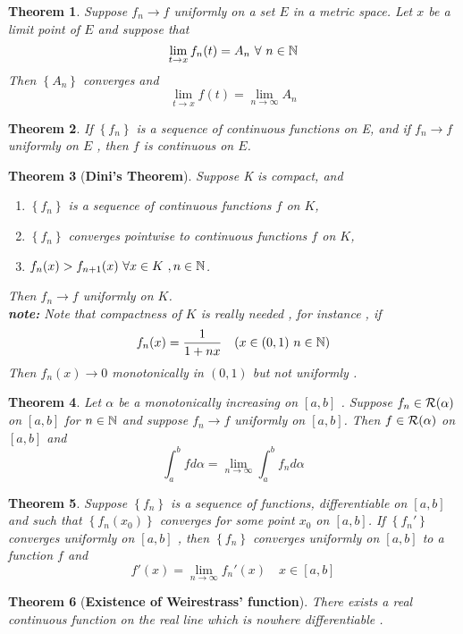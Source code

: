 \documentclass{article}
\newcommand{\set}[1]{\left\{#1\right\}}
\newtheorem{theorem}{Theorem}[section]
\begin{document}
\begin{theorem}
	Suppose $f_n\to f$ uniformly on a set $E$ in a metric space. Let $x$ be a limit point of $E$ and suppose that \[\lim\limits_{t\to x} f_n(t) = A_n \ \forall \ n\in \mathbb{N}\] Then $\set{A_n}$ converges and \[\lim\limits_{t\to x}f(t) = \lim\limits_{n\to \infty} A_n\]
\end{theorem}
\begin{theorem}
	If   $\set{f_n}$ is a sequence of continuous functions on E, and if $f_n \to f$ uniformly on $E$ , then $f$ is continuous on $E$.
	 
\end{theorem}
\begin{theorem}[\textbf{Dini's Theorem}]
	Suppose K is compact, and 
	\begin{enumerate}[label=(\alph*)]
		\item $\set{f_n}$ is a sequence of continuous functions $f$ on $K$,
		\item $\set{f_n}$ converges pointwise to continuous functions $f$ on $K$,
		\item $f_{n}(x)>f_{n+1}(x) \ \forall x \in K \ , n \in \mathbb{N}$. 
	\end{enumerate} 
Then $f_{n}\to f$ uniformly on $K$. \\
\textbf{\textit{note:}} Note that compactness of $K$ is really needed , for instance , if \[f_n(x) = \frac{1}{1+nx} \quad (x\in (0,1) \ n\in \mathbb{N})\] Then $f_n(x)\to 0$ monotonically in $(0,1)$ but not uniformly .

\end{theorem}
\begin{theorem}
	Let $\alpha$ be  a monotonically increasing on $[a,b] $ . Suppose $f_n\in \mathcal{R}(\alpha)$ on $[a,b]$  for $n\in \mathbb{N}$ and suppose $f_n\to f$ uniformly on $ [a,b] $. Then $f\in \mathcal{R} (\alpha)$ on $[a,b]$ and \[\int_{a}^{b}fd\alpha = \lim\limits_{n\to \infty}\int_{a}^{b}f_nd\alpha\] 
\end{theorem}
\begin{theorem}
	Suppose $\set{f_n}$ is a sequence of functions, differentiable on $[a,b]$ and such that $\set{f_n(x_0)}$ converges for some point $x_0$ on $[a,b]$. If $\set{f_n'}$ converges uniformly on $[a,b]$ , then $\set{f_n}$ converges uniformly on $[a,b]$ to a function $f$ and  \[f'(x) = \lim\limits_{n\to \infty}f_n'(x) \quad x\in [a,b]\]
\end{theorem}
\begin{theorem}[\textbf{Existence of Weirestrass' function}]
	There exists a real continuous function on the real line which is nowhere differentiable .
\end{theorem}
\end{document}

